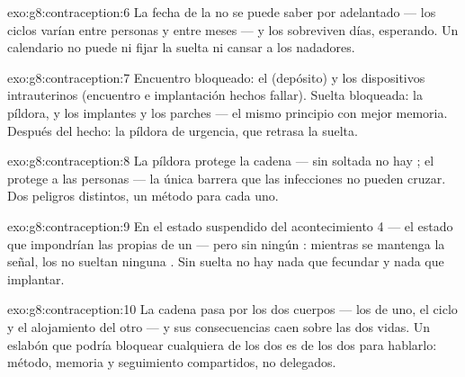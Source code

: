 \begin{solution}{exo:g8:contraception:6}
La fecha de la  no se puede saber por adelantado --- los
ciclos varían entre personas y entre meses --- y los 
sobreviven días, esperando. Un calendario no puede ni fijar la suelta
ni cansar a los nadadores.
\end{solution}

\begin{solution}{exo:g8:contraception:7}
Encuentro bloqueado: el  (depósito) y los dispositivos
intrauterinos (encuentro e implantación hechos fallar). Suelta
bloqueada: la píldora, y los implantes y los parches --- el mismo
principio con mejor memoria. Después del hecho: la píldora de urgencia,
que retrasa la suelta.
\end{solution}

\begin{solution}{exo:g8:contraception:8}
La píldora protege la cadena --- sin   soltada no hay
; el  protege a las personas --- la única barrera
que las infecciones no pueden cruzar. Dos peligros distintos, un método
para cada uno.
\end{solution}

\begin{solution}{exo:g8:contraception:9}
En el estado suspendido del acontecimiento 4 --- el estado que
impondrían las propias  de un  --- pero sin ningún
: mientras se mantenga la señal, los  no sueltan ninguna
 . Sin suelta no hay nada que fecundar y nada que
implantar.
\end{solution}

\begin{solution}{exo:g8:contraception:10}
La cadena pasa por los dos cuerpos --- los  de uno, el ciclo y
el alojamiento del otro --- y sus consecuencias caen sobre las dos
vidas. Un eslabón que podría bloquear cualquiera de los dos es de los
dos para hablarlo: método, memoria y seguimiento compartidos, no
delegados.
\end{solution}

